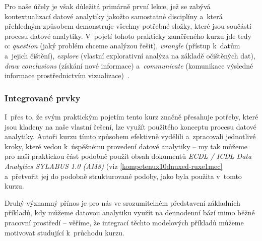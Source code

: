 Pro naše účely je však důležitá primárně první lekce, jež se zabývá kontextualizací datové analytiky jakožto samostatné disciplíny a~která přehledným způsobem demonstruje všechny potřebné složky, které jsou součástí procesu datové analytiky. V~pojetí tohoto prakticky zaměřeného kurzu jde tedy o: \emph{question} (jaký problém chceme analýzou řešit), \emph{wrangle} (přístup k~datům a~jejich čištění), \emph{explore} (vlastní explorativní analýza na základě očištěných dat), \emph{draw conclusions} (získání nové informace) a~\emph{communicate} (komunikace výsledné informace prostřednictvím vizualizace)~\parencite{course2}.

\hypertarget{integrovanuxe9-prvky-1}{%
\subsubsection{Integrované prvky}\label{integrovanuxe9-prvky-1}}

I~přes to, že svým praktickým pojetím tento kurz značně přesahuje potřeby, které jsou kladeny na naše vlastní řešení, lze využít použitého konceptu procesu datové analytiky. Autoři kurzu tímto způsobem efektivně vydělili a~zpracovali jednotlivé kroky, které vedou k~úspěšnému provedení datové analytiky -- my tak můžeme pro naši praktickou část podobně použít obsah dokumentů \emph{ECDL / ICDL Data Analytics SYLABUS 1.0 (AM8)} (viz \ref{kompetenux10dnuxed-ruxe1mec} a~přetvořit jej do podobně strukturované podoby, jako byla použita v~tomto kurzu.

Druhý významný přínos je pro nás ve srozumitelném představení základních příkladů, kdy můžeme datovou analytiku využít na dennodenní bází mimo běžné pracovní prostředí -- věříme, že integrací těchto modelových příkladů můžeme motivovat studující k~průchodu kurzu.
